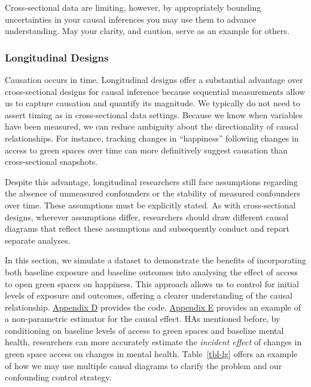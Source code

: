 \documentclass[
  singlecolumn]{article}
\begin{document}
Cross-sectional data are limiting, however, by appropriately bounding
uncertainties in your causal inferences you may use them to advance
understanding. May your clarity, and caution, serve as an example for
others.

\subsubsection{Longitudinal Designs}\label{longitudinal-designs}

Causation occurs in time. Longitudinal designs offer a substantial
advantage over cross-sectional designs for causal inference because
sequential measurements allow us to capture causation and quantify its
magnitude. We typically do not need to assert timing as in
cross-sectional data settings. Because we know when variables have been
measured, we can reduce ambiguity about the directionality of causal
relationships. For instance, tracking changes in ``happiness'' following
changes in access to green spaces over time can more definitively
suggest causation than cross-sectional snapshots.

Despite this advantage, longitudinal researchers still face assumptions
regarding the absence of unmeasured confounders or the stability of
measured confounders over time. These assumptions must be explicitly
stated. As with cross-sectional designs, wherever assumptions differ,
researchers should draw different causal diagrams that reflect these
assumptions and subsequently conduct and report separate analyses.

In this section, we simulate a dataset to demonstrate the benefits of
incorporating both baseline exposure and baseline outcomes into
analysing the effect of access to open green spaces on happiness. This
approach allows us to control for initial levels of exposure and
outcomes, offering a clearer understanding of the causal relationship.
\hyperref[appendix-d-simulation-of-different-confounding-control-strategies]{Appendix
D} provides the code.
\hyperref[appendix-e-non-parametric-estimation-of-average-treatment-effects-using-causal-forests-appendix-causal-forests]{Appendix
E} provides an example of a non-parametric estimator for the causal
effect. HAs mentioned before, by conditioning on baseline levels of
access to green spaces and baseline mental health, researchers can more
accurately estimate the \emph{incident effect} of changes in green space
access on changes in mental health. Table~\ref{tbl-lg} offers an example
of how we may use multiple causal diagrams to clarify the problem and
our confounding control strategy.
\end{document}
